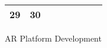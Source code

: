 {\begin{tabularx}{\linewidth}{|l!{\vrule width \myLenLineThicknessThick}*{7}{@{}X@{}|}}
      
      
        \begin{minipage}[t]{6mm}\centering{}29\end{minipage}
      
       & 
    
      
      
        \begin{minipage}[t]{6mm}\centering{}30\end{minipage}
      
       & 
    
      
      
       & 
    
      
      
       & 
    
      
      
       & 
    
      
      
       & 
    
      
      
      
        \\  \hline 
      
    
  
  
  \end{tabularx}
}
\vfill{\centering{} \small{AR Platform Development}\hspace{1.5em}\par}

